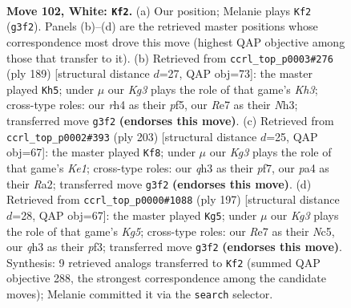 \documentclass[11pt]{article}
\begin{document}
\clearpage

\begin{figure}[p]\centering
\begin{subfigure}{0.46\textwidth}\centering
\resizebox{\linewidth}{!}{%
\newchessgame
\chessboard[
  setfen={1k6/4R3/8/8/p6r/P5Kq/8/8 w - - 1 102},
  showmover=false,
  pgfstyle=straightmove, color=movearrow, markmove={g3-f2}
]}
\caption{}
\end{subfigure}\hfill
\begin{subfigure}{0.46\textwidth}\centering
\resizebox{\linewidth}{!}{%
\newchessgame
\chessboard[
  setfen={8/1R4Q1/4P2k/5P2/P7/6Kn/8/8 b - - 0 95},
  showmover=false,
  pgfstyle=straightmove, color=movearrow, markmove={h6-h5}
]}
\caption{}
\end{subfigure}
\\[4pt]
\begin{subfigure}{0.46\textwidth}\centering
\resizebox{\linewidth}{!}{%
\newchessgame
\chessboard[
  setfen={4k3/3R1P2/8/5PK1/8/8/r7/8 b - - 0 102},
  showmover=false,
  pgfstyle=straightmove, color=movearrow, markmove={e8-f8}
]}
\caption{}
\end{subfigure}\hfill
\begin{subfigure}{0.46\textwidth}\centering
\resizebox{\linewidth}{!}{%
\newchessgame
\chessboard[
  setfen={8/5R2/8/2n1p3/6k1/4KP2/8/8 b - - 0 99},
  showmover=false,
  pgfstyle=straightmove, color=movearrow, markmove={g4-g5}
]}
\caption{}
\end{subfigure}
\caption{\textbf{Move 102, White: \texttt{Kf2}.} (a) Our position; Melanie plays \texttt{Kf2} (\texttt{g3f2}). Panels (b)--(d) are the retrieved master positions whose correspondence most drove this move (highest QAP objective among those that transfer to it). (b) Retrieved from \texttt{ccrl\_top\_p0003\#276} (ply 189) [structural distance $d$=27, QAP obj=73]: the master played \texttt{Kh5}; under $\mu$ our \emph{Kg3} plays the role of that game's \emph{Kh3}; cross-type roles: our \emph{r}h4 as their \emph{p}f5, our \emph{R}e7 as their \emph{N}h3; transferred move \texttt{g3f2} \textbf{(endorses this move)}. (c) Retrieved from \texttt{ccrl\_top\_p0002\#393} (ply 203) [structural distance $d$=25, QAP obj=67]: the master played \texttt{Kf8}; under $\mu$ our \emph{Kg3} plays the role of that game's \emph{Ke1}; cross-type roles: our \emph{q}h3 as their \emph{p}f7, our \emph{p}a4 as their \emph{R}a2; transferred move \texttt{g3f2} \textbf{(endorses this move)}. (d) Retrieved from \texttt{ccrl\_top\_p0000\#1088} (ply 197) [structural distance $d$=28, QAP obj=67]: the master played \texttt{Kg5}; under $\mu$ our \emph{Kg3} plays the role of that game's \emph{Kg5}; cross-type roles: our \emph{R}e7 as their \emph{N}c5, our \emph{q}h3 as their \emph{p}f3; transferred move \texttt{g3f2} \textbf{(endorses this move)}. Synthesis: 9 retrieved analogs transferred to \texttt{Kf2} (summed QAP objective 288, the strongest correspondence among the candidate moves); Melanie committed it via the \texttt{search} selector.}
\label{fig:thought-m202}
\end{figure}
\end{document}

